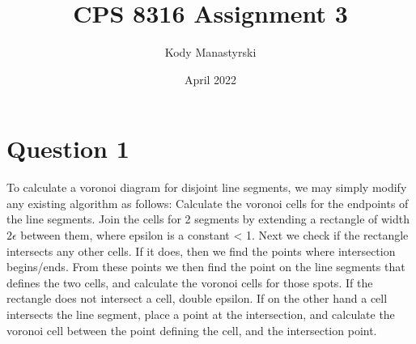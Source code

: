 \documentclass{article}
\title{CPS 8316 Assignment 3}
\date{April 2022}
\author{Kody Manastyrski}
\begin{document}
\maketitle

\section{Question 1}

To calculate a voronoi diagram for disjoint line segments, we may simply modify
any existing algorithm as follows:
Calculate the voronoi cells for the endpoints of the line segments.
Join the cells for 2 segments by extending a rectangle of width $2\epsilon$ between them, where
epsilon is a constant < 1.  
Next we check if the rectangle intersects any other cells.
If it does, then we find the points where intersection begins/ends.
From these points we then find the point on the line segments that defines the two cells, and
calculate the voronoi cells for those spots. 
If the rectangle does not intersect a cell, double epsilon.
If on the other hand a cell intersects the line segment, place a point at the intersection, and calculate the
voronoi cell between the point defining the cell, and the intersection point. 
\end{document}
